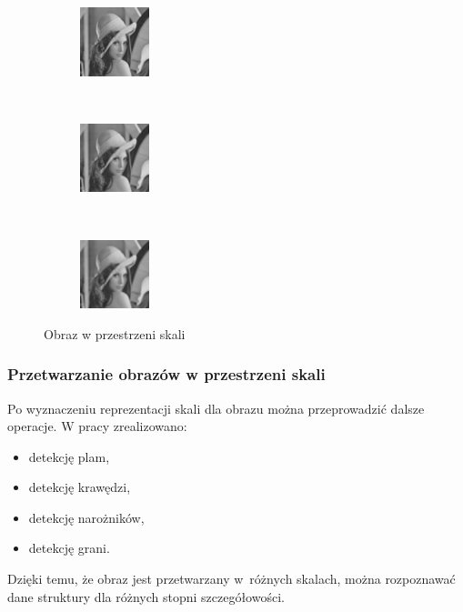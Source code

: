 \begin{frame}
\begin{figure}[h]
\begin{center}
		 
\begin{subfigure}[b]{2cm}
                 \centering
                 \includegraphics[width=2cm]{Lena_scales4.jpg}
         \end{subfigure}%
		 ~
		 \begin{subfigure}[b]{2cm}
                 \centering
                 \includegraphics[width=2cm]{Lena_scales5.jpg}
         \end{subfigure}%
		 ~
\begin{subfigure}[b]{2cm}
                 \centering
                 \includegraphics[width=2cm]{Lena_scales6.jpg}
         \end{subfigure}%
\caption{Obraz w przestrzeni skali}
\label{lena_scales}
\end{center}
\end{figure}
\end{frame}


\begin{frame}
\frametitle{Przetwarzanie obrazów w przestrzeni skali}

Po wyznaczeniu reprezentacji skali dla obrazu można przeprowadzić dalsze operacje. W pracy zrealizowano:
\begin{itemize}
\item detekcję plam,
\item detekcję krawędzi,
\item detekcję narożników,
\item detekcję grani.
\end{itemize}
Dzięki temu, że obraz jest przetwarzany w~różnych skalach, można rozpoznawać dane struktury dla różnych stopni szczegółowości.
\end{frame}

